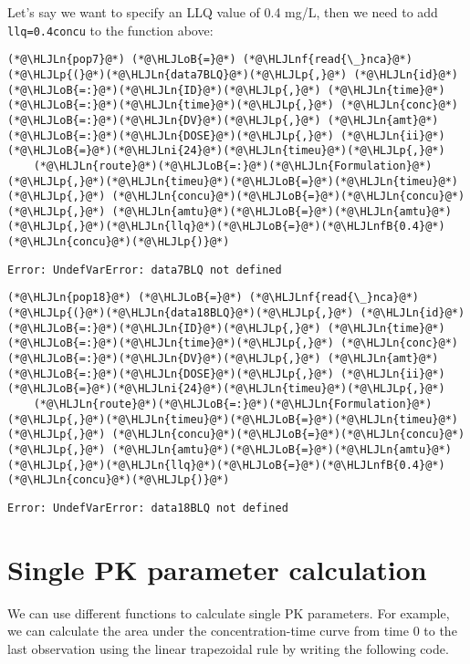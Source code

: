 \documentclass[12pt,a4paper]{article}
\newcommand{\HLJLn}[1]{#1}
\newcommand{\HLJLnf}[1]{\textcolor[RGB]{66,102,213}{#1}}
\newcommand{\HLJLnfB}[1]{\textcolor[RGB]{59,151,46}{#1}}
\newcommand{\HLJLni}[1]{\textcolor[RGB]{59,151,46}{#1}}
\newcommand{\HLJLoB}[1]{\textcolor[RGB]{102,102,102}{\textbf{#1}}}
\newcommand{\HLJLp}[1]{#1}
\begin{document}
Let's say we want to specify an LLQ value of 0.4 mg/L, then we need to add \texttt{llq=0.4concu} to the function above:


\begin{lstlisting}
(*@\HLJLn{pop7}@*) (*@\HLJLoB{=}@*) (*@\HLJLnf{read{\_}nca}@*)(*@\HLJLp{(}@*)(*@\HLJLn{data7BLQ}@*)(*@\HLJLp{,}@*) (*@\HLJLn{id}@*)(*@\HLJLoB{=:}@*)(*@\HLJLn{ID}@*)(*@\HLJLp{,}@*) (*@\HLJLn{time}@*)(*@\HLJLoB{=:}@*)(*@\HLJLn{time}@*)(*@\HLJLp{,}@*) (*@\HLJLn{conc}@*)(*@\HLJLoB{=:}@*)(*@\HLJLn{DV}@*)(*@\HLJLp{,}@*) (*@\HLJLn{amt}@*)(*@\HLJLoB{=:}@*)(*@\HLJLn{DOSE}@*)(*@\HLJLp{,}@*) (*@\HLJLn{ii}@*)(*@\HLJLoB{=}@*)(*@\HLJLni{24}@*)(*@\HLJLn{timeu}@*)(*@\HLJLp{,}@*)
    (*@\HLJLn{route}@*)(*@\HLJLoB{=:}@*)(*@\HLJLn{Formulation}@*)(*@\HLJLp{,}@*)(*@\HLJLn{timeu}@*)(*@\HLJLoB{=}@*)(*@\HLJLn{timeu}@*)(*@\HLJLp{,}@*) (*@\HLJLn{concu}@*)(*@\HLJLoB{=}@*)(*@\HLJLn{concu}@*)(*@\HLJLp{,}@*) (*@\HLJLn{amtu}@*)(*@\HLJLoB{=}@*)(*@\HLJLn{amtu}@*)(*@\HLJLp{,}@*)(*@\HLJLn{llq}@*)(*@\HLJLoB{=}@*)(*@\HLJLnfB{0.4}@*)(*@\HLJLn{concu}@*)(*@\HLJLp{)}@*)
\end{lstlisting}

\begin{lstlisting}
Error: UndefVarError: data7BLQ not defined
\end{lstlisting}


\begin{lstlisting}
(*@\HLJLn{pop18}@*) (*@\HLJLoB{=}@*) (*@\HLJLnf{read{\_}nca}@*)(*@\HLJLp{(}@*)(*@\HLJLn{data18BLQ}@*)(*@\HLJLp{,}@*) (*@\HLJLn{id}@*)(*@\HLJLoB{=:}@*)(*@\HLJLn{ID}@*)(*@\HLJLp{,}@*) (*@\HLJLn{time}@*)(*@\HLJLoB{=:}@*)(*@\HLJLn{time}@*)(*@\HLJLp{,}@*) (*@\HLJLn{conc}@*)(*@\HLJLoB{=:}@*)(*@\HLJLn{DV}@*)(*@\HLJLp{,}@*) (*@\HLJLn{amt}@*)(*@\HLJLoB{=:}@*)(*@\HLJLn{DOSE}@*)(*@\HLJLp{,}@*) (*@\HLJLn{ii}@*)(*@\HLJLoB{=}@*)(*@\HLJLni{24}@*)(*@\HLJLn{timeu}@*)(*@\HLJLp{,}@*)
    (*@\HLJLn{route}@*)(*@\HLJLoB{=:}@*)(*@\HLJLn{Formulation}@*)(*@\HLJLp{,}@*)(*@\HLJLn{timeu}@*)(*@\HLJLoB{=}@*)(*@\HLJLn{timeu}@*)(*@\HLJLp{,}@*) (*@\HLJLn{concu}@*)(*@\HLJLoB{=}@*)(*@\HLJLn{concu}@*)(*@\HLJLp{,}@*) (*@\HLJLn{amtu}@*)(*@\HLJLoB{=}@*)(*@\HLJLn{amtu}@*)(*@\HLJLp{,}@*)(*@\HLJLn{llq}@*)(*@\HLJLoB{=}@*)(*@\HLJLnfB{0.4}@*)(*@\HLJLn{concu}@*)(*@\HLJLp{)}@*)
\end{lstlisting}

\begin{lstlisting}
Error: UndefVarError: data18BLQ not defined
\end{lstlisting}


\section{Single PK parameter calculation}
We can use different functions to calculate single PK parameters. For example, we can calculate the area under the concentration-time curve from time 0 to the last observation using the linear trapezoidal rule by writing the following code.
\end{document}
